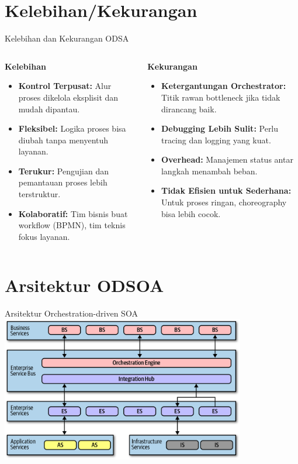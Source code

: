 \documentclass[aspectratio=169, table]{beamer}
\begin{document}
\section{Kelebihan/Kekurangan}
\begin{frame}[fragile]{Kelebihan dan Kekurangan ODSA}
	\vspace{4pt}
	\begin{columns}[T]
		\begin{column}{0.5\textwidth}
			\textbf{Kelebihan}
			\begin{itemize}
				\item \textbf{Kontrol Terpusat:} Alur proses dikelola eksplisit dan mudah dipantau.
				\item \textbf{Fleksibel:} Logika proses bisa diubah tanpa menyentuh layanan.
				\item \textbf{Terukur:} Pengujian dan pemantauan proses lebih terstruktur.
				\item \textbf{Kolaboratif:} Tim bisnis buat workflow (BPMN), tim teknis fokus layanan.
			\end{itemize}
		\end{column}
		
		\begin{column}{0.5\textwidth}
			\textbf{Kekurangan}
			\begin{itemize}
				\item \textbf{Ketergantungan Orchestrator:} Titik rawan bottleneck jika tidak dirancang baik.
				\item \textbf{Debugging Lebih Sulit:} Perlu tracing dan logging yang kuat.
				\item \textbf{Overhead:} Manajemen status antar langkah menambah beban.
				\item \textbf{Tidak Efisien untuk Sederhana:} Untuk proses ringan, choreography bisa lebih cocok.
			\end{itemize}
		\end{column}
	\end{columns}
\end{frame}

\section{Arsitektur ODSOA}
\begin{frame}{Arsitektur Orchestration-driven SOA}
	\vspace{20pt}
	\centering
	\includegraphics[width=0.8\textwidth]{../../images/orchestration-example}
\end{frame}
\end{document}
